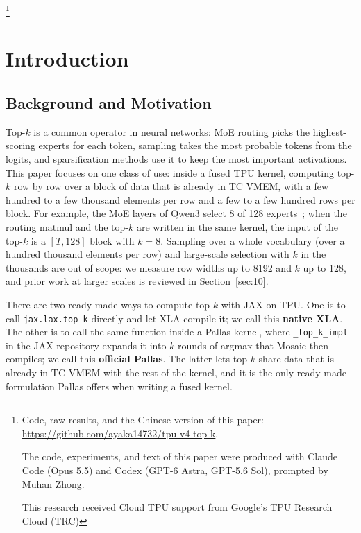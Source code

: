 \documentclass[sigconf,nonacm,balance=false]{acmart}
\newcommand{\code}[1]{\texttt{#1}}
\begin{document}

\thanks{Code, raw results, and the Chinese version of this paper: \url{https://github.com/ayaka14732/tpu-v4-top-k}.
\par\smallskip
The code, experiments, and text of this paper were produced with Claude Code (Opus 5.5) and Codex (GPT-6 Astra, GPT-5.6 Sol), prompted by Muhan Zhong.
\par\smallskip
This research received Cloud TPU support from Google's TPU Research Cloud (TRC)}
\maketitle

\section{Introduction}
\label{sec:1}

\subsection{Background and Motivation}
\label{sec:1.1}

Top-$k$ is a common operator in neural networks: MoE routing picks the highest-scoring experts for each token, sampling takes the most probable tokens from the logits, and sparsification methods use it to keep the most important activations. This paper focuses on one class of use: inside a fused TPU kernel, computing top-$k$ row by row over a block of data that is already in TC VMEM, with a few hundred to a few thousand elements per row and a few to a few hundred rows per block. For example, the MoE layers of Qwen3 select 8 of 128 experts~\cite{qwen3}; when the routing matmul and the top-$k$ are written in the same kernel, the input of the top-$k$ is a $[T,128]$ block with $k = 8$. Sampling over a whole vocabulary (over a hundred thousand elements per row) and large-scale selection with $k$ in the thousands are out of scope: we measure row widths up to 8192 and $k$ up to 128, and prior work at larger scales is reviewed in Section~\ref{sec:10}.

There are two ready-made ways to compute top-$k$ with JAX on TPU. One is to call \code{jax.\allowbreak{}lax.\allowbreak{}top\_\allowbreak{}k} directly and let XLA compile it; we call this \textbf{native XLA}. The other is to call the same function inside a Pallas kernel, where \code{\_\allowbreak{}top\_\allowbreak{}k\_\allowbreak{}impl} in the JAX repository expands it into $k$ rounds of argmax that Mosaic then compiles; we call this \textbf{official Pallas}. The latter lets top-$k$ share data that is already in TC VMEM with the rest of the kernel, and it is the only ready-made formulation Pallas offers when writing a fused kernel.
\end{document}
